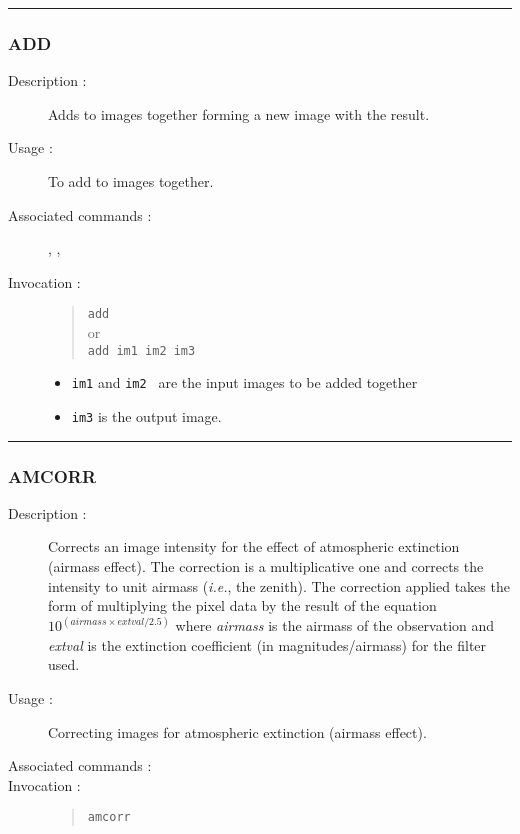 \hrule 
\subsubsection*{\label{ADD}ADD}

\begin{description}

\item[Description :] Adds to images together forming a new image with
the result.

\item[Usage :] To add to images together.

\item[Associated commands :] {\tt {}}, 
{\tt {}}, {\tt {}}

\item[Invocation :]

\begin{quote}
{\tt add} \\ 
or \\
{\tt  add im1 im2 im3}
\end{quote}

\begin{itemize}
\item {\tt im1} and {\tt im2 } are the input images to be added together
\item {\tt im3} is the output image.
\end{itemize}

\end{description}

\hrule
\subsubsection*{\label{AMCORR}AMCORR}

\begin{description}

\item[Description :] Corrects an image intensity for the effect of
atmospheric extinction (airmass effect).  The correction is a
multiplicative one and corrects the intensity to unit airmass
(\emph{i.e.}, the zenith).  The correction applied takes the form of
multiplying the pixel data by the result of the equation $10^{(airmass
\times extval/2.5)}$ where {\it airmass} is the airmass of the
observation and {\it extval} is the extinction coefficient (in
magnitudes/airmass) for the filter used.

\item[Usage :] Correcting images for atmospheric extinction (airmass effect).

\item[Associated commands :] {\tt {}}

\item[Invocation :]

\begin{quote}{\tt  amcorr }\end{quote}

\end{description}

